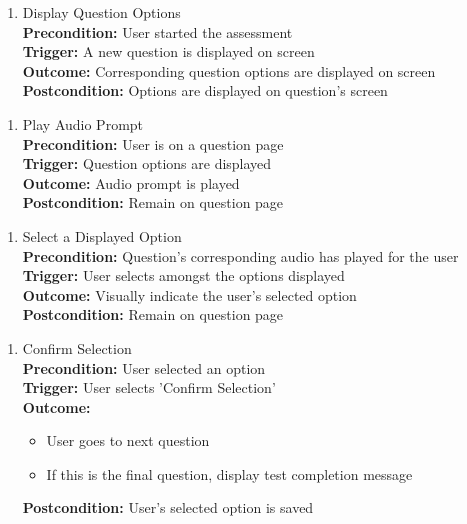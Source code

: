 \documentclass[12pt]{article}
\begin{document}
\begin{enumerate}[{PUC-}17. ]
  \item Display Question Options\\
  \textbf{Precondition: }User started the assessment\\
  \textbf{Trigger: }A new question is displayed on screen\\
  \textbf{Outcome: }Corresponding question options are displayed on screen\\
  \textbf{Postcondition: }Options are displayed on question's screen\\
\end{enumerate}

\begin{enumerate}[{PUC-}18. ]
  \item Play Audio Prompt\\
  \textbf{Precondition: }User is on a question page\\
  \textbf{Trigger: }Question options are displayed\\
  \textbf{Outcome: }Audio prompt is played\\
  \textbf{Postcondition: }Remain on question page\\
\end{enumerate}

\begin{enumerate}[{PUC-}19. ]
  \item Select a Displayed Option\\
  \textbf{Precondition: }Question's corresponding audio has played for the user\\
  \textbf{Trigger: }User selects amongst the options displayed\\
  \textbf{Outcome: }Visually indicate the user's selected option\\
  \textbf{Postcondition: }Remain on question page\\
\end{enumerate}

\begin{enumerate}[{PUC-}20. ]
  \item Confirm Selection\\
  \textbf{Precondition: }User selected an option\\
  \textbf{Trigger: }User selects 'Confirm Selection'\\
  \textbf{Outcome: }
  \begin{itemize}
    \item User goes to next question
    \item If this is the final question, display test completion message
  \end{itemize}
  \textbf{Postcondition: }User's selected option is saved\\
\end{enumerate}
\end{document}
